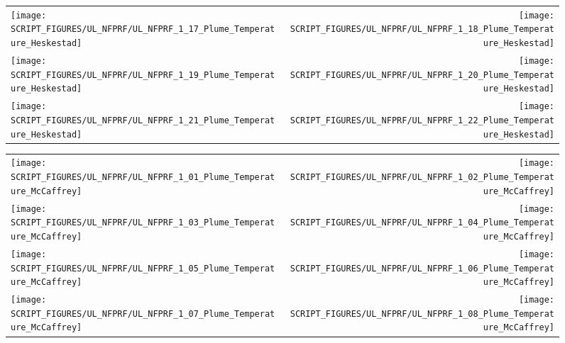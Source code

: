 \begin{figure}[p]
\begin{tabular*}{\textwidth}{l@{\extracolsep{\fill}}r}
\texttt{[image: SCRIPT\_FIGURES/UL\_NFPRF/UL\_NFPRF\_1\_17\_Plume\_Temperature\_Heskestad]} &
\texttt{[image: SCRIPT\_FIGURES/UL\_NFPRF/UL\_NFPRF\_1\_18\_Plume\_Temperature\_Heskestad]} \\
\texttt{[image: SCRIPT\_FIGURES/UL\_NFPRF/UL\_NFPRF\_1\_19\_Plume\_Temperature\_Heskestad]} &
\texttt{[image: SCRIPT\_FIGURES/UL\_NFPRF/UL\_NFPRF\_1\_20\_Plume\_Temperature\_Heskestad]} \\
\texttt{[image: SCRIPT\_FIGURES/UL\_NFPRF/UL\_NFPRF\_1\_21\_Plume\_Temperature\_Heskestad]} &
\texttt{[image: SCRIPT\_FIGURES/UL\_NFPRF/UL\_NFPRF\_1\_22\_Plume\_Temperature\_Heskestad]}
\end{tabular*}
\end{figure}

\begin{figure}[p]
\begin{tabular*}{\textwidth}{l@{\extracolsep{\fill}}r}
\texttt{[image: SCRIPT\_FIGURES/UL\_NFPRF/UL\_NFPRF\_1\_01\_Plume\_Temperature\_McCaffrey]} &
\texttt{[image: SCRIPT\_FIGURES/UL\_NFPRF/UL\_NFPRF\_1\_02\_Plume\_Temperature\_McCaffrey]} \\
\texttt{[image: SCRIPT\_FIGURES/UL\_NFPRF/UL\_NFPRF\_1\_03\_Plume\_Temperature\_McCaffrey]} &
\texttt{[image: SCRIPT\_FIGURES/UL\_NFPRF/UL\_NFPRF\_1\_04\_Plume\_Temperature\_McCaffrey]} \\
\texttt{[image: SCRIPT\_FIGURES/UL\_NFPRF/UL\_NFPRF\_1\_05\_Plume\_Temperature\_McCaffrey]} &
\texttt{[image: SCRIPT\_FIGURES/UL\_NFPRF/UL\_NFPRF\_1\_06\_Plume\_Temperature\_McCaffrey]} \\
\texttt{[image: SCRIPT\_FIGURES/UL\_NFPRF/UL\_NFPRF\_1\_07\_Plume\_Temperature\_McCaffrey]} &
\texttt{[image: SCRIPT\_FIGURES/UL\_NFPRF/UL\_NFPRF\_1\_08\_Plume\_Temperature\_McCaffrey]}
\end{tabular*}
\end{figure}

